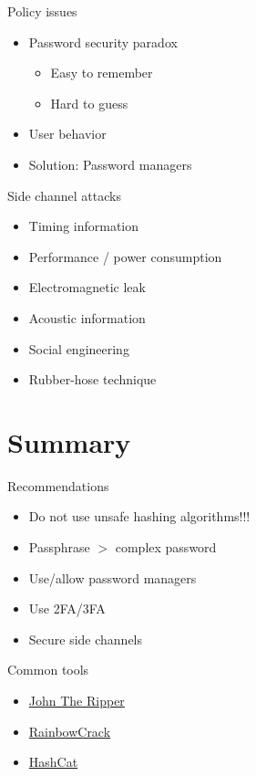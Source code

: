 \documentclass{curs}
\begin{document}
\begin{frame}{Policy issues}
  \begin{itemize}
    \item Password security paradox
      \begin{itemize}
        \item Easy to remember
        \item Hard to guess
      \end{itemize}
    \item User behavior
    \item Solution: Password managers
  \end{itemize}
\end{frame}


\begin{frame}{Side channel attacks}
  \begin{itemize}
    \item Timing information
    \item Performance / power consumption 
    \item Electromagnetic leak
    \item Acoustic information
    \item Social engineering
    \item Rubber-hose technique
  \end{itemize}
\end{frame}


\section{Summary}

\begin{frame}{Recommendations}
  \begin{itemize}
    \item Do not use unsafe hashing algorithms!!!
    \item Passphrase $>$ complex password
    \item Use/allow password managers
    \item Use 2FA/3FA
    \item Secure side channels
  \end{itemize}
\end{frame}

\begin{frame}{Common tools}
  \begin{itemize}
    \item \href{http://www.openwall.com/john/}{John The Ripper}
    \item \href{http://project-rainbowcrack.com/}{RainbowCrack}
    \item \href{https://hashcat.net/hashcat/}{HashCat}
  \end{itemize}
\end{frame}
\end{document}
